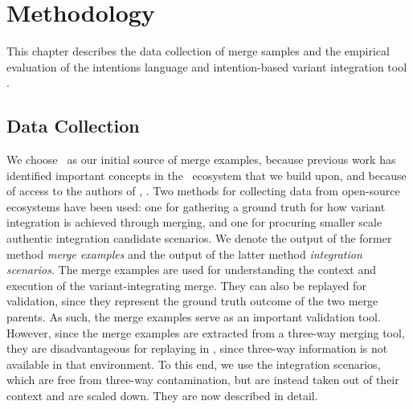 \chapter{Methodology}
This chapter describes the data collection of merge samples and the empirical evaluation of the intentions language and intention-based variant integration tool \tooln.

\section{Data Collection}
We choose \marlin~as our initial source of merge examples, because previous work has identified important concepts in the \marlin~ecosystem that we build upon, and because of access to the authors of \cite{stanciulescu2015}, \cite{stanciulescu2016concepts}. Two methods for collecting data from open-source ecosystems have been used: one for gathering a ground truth for how variant integration is achieved through merging, and one for procuring smaller scale authentic integration candidate scenarios. We denote the output of the former method \textit{merge examples} and the output of the latter method \textit{integration scenarios}. The merge examples are used for understanding the context and execution of the variant-integrating merge. They can also be replayed for validation, since they represent the ground truth outcome of the two merge parents. As such, the merge examples serve as an important validation tool. However, since the merge examples are extracted from a three-way merging tool, they are disadvantageous for replaying in \tooln, since three-way information is not available in that environment. To this end, we use the integration scenarios, which are free from three-way contamination, but are instead taken out of their context and are scaled down. They are now described in detail.

